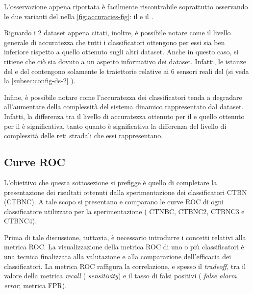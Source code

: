 L'osservazione appena riportata è facilmente riscontrabile soprattutto osservando le due varianti del  nella \autoref{fig:accuracies-fig}: il  e il .

Riguardo i $2$ dataset appena citati, inoltre, è possibile notare come il livello generale di accuratezza che tutti i classificatori ottengono per essi sia ben inferiore rispetto a quello ottenuto sugli altri dataset. Anche in questo caso, si ritiene che ciò sia dovuto a un aspetto informativo dei dataset. Infatti, le istanze del  e del  contengono solamente le traiettorie relative ai $6$ sensori reali del  (si veda la \autoref{subsec:config-ds-2} ).

Infine, è possibile notare come l'accuratezza dei classificatori tenda a degradare all'aumentare della complessità del sistema dinamico rappresentato dal dataset. Infatti, la differenza tra il livello di accuratezza ottenuto per il  e quello ottenuto per il  è significativa, tanto quanto è significativa la differenza del livello di complessità delle reti stradali che essi rappresentano.

\subsection{Curve ROC}
L'obiettivo che questa sottosezione si prefigge è quello di completare la presentazione dei risultati ottenuti dalla sperimentazione dei classificatori \acs{CTBN} (\acs{CTBNC}). A tale scopo si presentano e comparano le curve \acf{ROC} di ogni classificatore utilizzato per la sperimentazione (\ie{} \acs{CTNBC}, \acs{CTBNC}$2$, \acs{CTBNC}$3$ e \acs{CTBNC}$4$).

Prima di tale discussione, tuttavia, è necessario introdurre i concetti relativi alla metrica \acs{ROC}. La visualizzazione della metrica \acs{ROC} di uno o più classificatori è una tecnica finalizzata alla valutazione e alla comparazione dell'efficacia dei classificatori. La metrica \acs{ROC} raffigura la correlazione, e spesso il \emph{tradeoff}, tra il valore della metrica \emph{recall} (\ie{} \emph{sensitivity}) e il tasso di falsi positivi (\ie{} \emph{false alarm error}; metrica \acs{FPR}).


